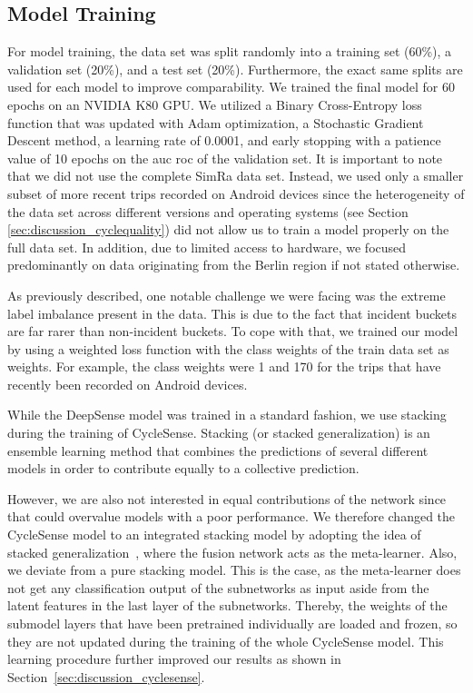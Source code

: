 \subsection{Model Training}
\label{subsec:model_training}
For model training, the data set was split randomly into a training set (60\%), a validation set (20\%), and a test set (20\%).
Furthermore, the exact same splits are used for each model to improve comparability.
We trained the final model for 60 epochs on an NVIDIA K80 GPU.
We utilized a Binary Cross-Entropy loss function that was updated with Adam optimization, a Stochastic Gradient Descent method, a learning rate of 0.0001, and early stopping with a patience value of 10 epochs on the \ac{auc} \ac{roc} of the validation set.
It is important to note that we did not use the complete SimRa data set.
Instead, we used only a smaller subset of more recent trips recorded on Android devices since the heterogeneity of the data set across different versions and operating systems (see Section \ref{sec:discussion_cyclequality}) did not allow us to train a model properly on the full data set.
In addition, due to limited access to hardware, we focused predominantly on data originating from the Berlin region if not stated otherwise.

As previously described, one notable challenge we were facing was the extreme label imbalance present in the data.
This is due to the fact that incident buckets are far rarer than non-incident buckets.
To cope with that, we trained our model by using a weighted loss function with the class weights of the train data set as weights.
For example, the class weights were 1 and 170 for the trips that have recently been recorded on Android devices.

While the DeepSense model was trained in a standard fashion, we use stacking during the training of CycleSense.
Stacking (or stacked generalization) is an ensemble learning method that combines the predictions of several different models in order to contribute equally to a collective prediction.

However, we are also not interested in equal contributions of the network since that could overvalue models with a poor performance.
We therefore changed the CycleSense model to an integrated stacking model by adopting the idea of stacked generalization~\cite{wolpert1992stacked}, where the fusion network acts as the meta-learner.
Also, we deviate from a pure stacking model.
This is the case, as the meta-learner does not get any classification output of the subnetworks as input aside from the latent features in the last layer of the subnetworks.
Thereby, the weights of the submodel layers that have been pretrained individually are loaded and frozen, so they are not updated during the training of the whole CycleSense model.
This learning procedure further improved our results as shown in Section~\ref{sec:discussion_cyclesense}.

